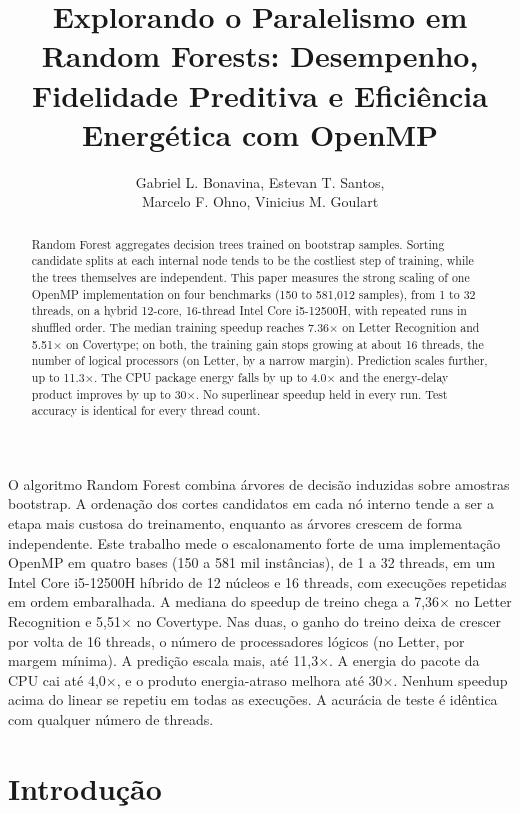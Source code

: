 \documentclass[12pt]{article}
\title{Explorando o Paralelismo em Random Forests: Desempenho,\\
Fidelidade Preditiva e Eficiência Energética com OpenMP}
\author{Gabriel L. Bonavina\inst{1}, Estevan T. Santos\inst{1},\\
Marcelo F. Ohno\inst{1}, Vinicius M. Goulart\inst{1}}
\begin{document}
\maketitle

\begin{abstract}
Random Forest aggregates decision trees trained on bootstrap samples. Sorting
candidate splits at each internal node tends to be the costliest step of training,
while the trees themselves are independent. This paper measures the strong scaling of
one OpenMP implementation on four benchmarks (150 to 581{,}012 samples), from 1
to 32 threads, on a hybrid 12-core, 16-thread Intel Core i5-12500H, with repeated
runs in shuffled order. The median training speedup reaches 7.36$\times$ on Letter
Recognition and 5.51$\times$ on Covertype; on both, the training gain stops growing
at about 16 threads, the number of logical processors (on Letter, by a narrow
margin). Prediction scales further, up to 11.3$\times$. The CPU package energy falls
by up to 4.0$\times$ and the energy-delay product improves by up to 30$\times$. No superlinear speedup held in every run. Test accuracy is identical
for every thread count.
\end{abstract}

\begin{resumo}
O algoritmo Random Forest combina árvores de decisão induzidas sobre amostras
bootstrap. A ordenação dos cortes candidatos em cada nó interno tende a ser a etapa
mais custosa do treinamento, enquanto as árvores crescem de forma independente. Este trabalho mede o escalonamento forte de uma implementação
OpenMP em quatro bases (150 a 581 mil instâncias), de 1 a 32 threads, em um
Intel Core i5-12500H híbrido de 12 núcleos e 16 threads, com execuções repetidas em
ordem embaralhada. A mediana do speedup de treino chega a 7{,}36$\times$ no Letter
Recognition e 5{,}51$\times$ no Covertype. Nas duas, o ganho do treino deixa de
crescer por volta de 16 threads, o número de processadores lógicos (no Letter, por
margem mínima). A predição escala mais, até 11{,}3$\times$. A energia do pacote da
CPU cai até 4{,}0$\times$, e o produto energia-atraso melhora até 30$\times$.
Nenhum speedup acima do linear se repetiu em todas as execuções. A acurácia de
teste é idêntica com qualquer número de threads.
\end{resumo}

\section{Introdução}
\end{document}
